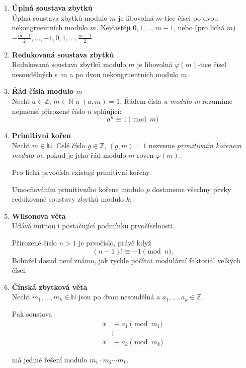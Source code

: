 \documentclass[12pt,a4paper]{article}
\begin{document}
\begin{enumerate}
	\item \textbf{Úplná soustava zbytků}\\
		Úplná soustava zbytků modulo $m$ je libovolná $m$-tice čísel po dvou
		nekongruentních modulo $m$. Nejčastěji $0, 1, \dots, m-1$, nebo
		(pro lichá $m$) $-\frac{m-1}{2}, \dots, -1, 0, 1, \dots, \frac{m-1}{2}$.

	\item \textbf{Redukovaná soustava zbytků}\\
		Redukovaná soustava zbytků modulo $m$ je libovolná $\varphi(m)$-tice
		čísel nesoudělných s~$m$ a po dvou nekongruentních modulo $m$.

	\item \textbf{Řád čísla modulo $m$}\\
		Nechť $a \in \mathbb{Z}$, $m \in \mathbb{N}$ a $(a,m) = 1$. Řádem čísla
		\textit{a modulo m} rozumíme nejmenší přirozené číslo $n$ splňující:
		\[ a^n \equiv 1 \pmod{m} \]

	\item \textbf{Primitivní kořen}\\
		Nechť $m \in \mathbb{N}$. Celé číslo $g \in \mathbb{Z}$, $(g,m) = 1$
		nezveme \textit{primitivním kořenem modulo m}, pokud je jeho řád modulo
		$m$ roven $\varphi(m)$.

		Pro lichá prvočísla existují primitivní kořeny.

		Umocňováním primitivního kořene modulo $p$ dostaneme všechny prvky
		redukované soustavy zbytků modulo $k$.

	\item \textbf{Wilsonova věta}\\
		Udává nutnou i postačující podmínku prvočíselnosti.

		Přirozené číslo $n > 1$ je prvočíslo, právě když
		\[ (n-1)! \equiv -1 \pmod{n}. \]
		Bohužel dosud není známo, jak rychle počítat modulární faktoriál velkých
		čísel.

	\item \textbf{Čínská zbytková věta}\\
		Nechť $m_1, \ldots, m_k \in \mathbb{N}$ jsou po dvou nesoudělná a
		$a_1, \ldots, a_k \in \mathbb{Z}$.

		Pak soustava
		\begin{align*}
			x &\equiv a_1 \pmod{m_1}\\
			&\vdots\\
			x &\equiv a_k \pmod{m_k}
		\end{align*}

		má jediné řešení modulo $m_1 \cdot m_2 \cdots m_k$.


\end{enumerate}
\end{document}
